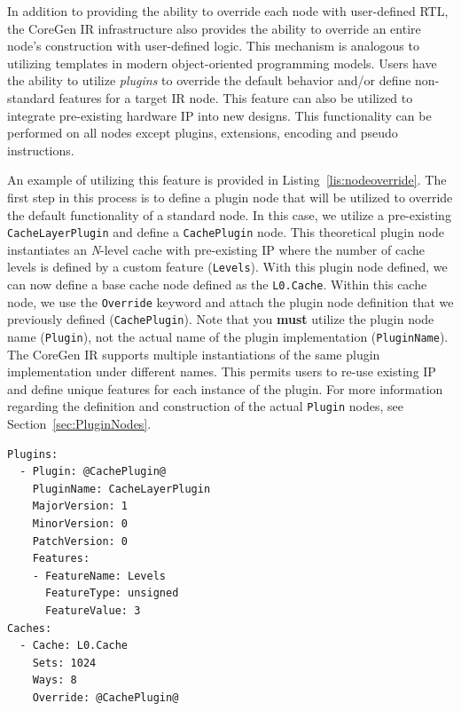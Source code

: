 \documentclass{article}
\begin{document}
In addition to providing the ability to override each node with user-defined RTL, the CoreGen IR infrastructure 
also provides the ability to override an entire node's construction with user-defined logic.  This mechanism is analogous 
to utilizing templates in modern object-oriented programming models.  Users have the ability to utilize \textit{plugins} to override 
the default behavior and/or define non-standard features for a target IR node.  This feature can also be utilized to integrate pre-existing 
hardware IP into new designs.  This functionality 
can be performed on all nodes except plugins, extensions, encoding and pseudo instructions.  

An example of utilizing this feature is provided in Listing~\ref{lis:nodeoverride}.  The first step in this process is to define a plugin node 
that will be utilized to override the default functionality of a standard node.  In this case, we utilize a pre-existing \texttt{CacheLayerPlugin} 
and define a \texttt{CachePlugin} node.  This theoretical plugin node instantiates an \textit{N}-level cache with pre-existing IP where the number 
of cache levels is defined by a custom feature (\texttt{Levels}).  With this plugin node defined, we can now define a base cache node defined 
as the \texttt{L0.Cache}.  Within this cache node, we use the \texttt{Override} keyword and attach the plugin node definition that we previously 
defined (\texttt{CachePlugin}).  Note that you \textbf{must} utilize the plugin node name (\texttt{Plugin}), not the actual name of the plugin 
implementation (\texttt{PluginName}).  The CoreGen IR supports multiple instantiations of the same plugin implementation under different names.  
This permits users to re-use existing IP and define unique features for each instance of the plugin.  
For more information regarding the definition and construction of the actual \texttt{Plugin} nodes, see Section~\ref{sec:PluginNodes}.  

\vspace{0.125in}
\begin{lstlisting}[frame=single,style=base,showstringspaces=false,caption={Sample Node Override},captionpos=b,label={lis:nodeoverride}]
Plugins:
  - Plugin: @CachePlugin@
    PluginName: CacheLayerPlugin
    MajorVersion: 1
    MinorVersion: 0
    PatchVersion: 0
    Features:
    - FeatureName: Levels
      FeatureType: unsigned
      FeatureValue: 3
Caches:
  - Cache: L0.Cache
    Sets: 1024
    Ways: 8
    Override: @CachePlugin@
\end{lstlisting}  
\end{document}
